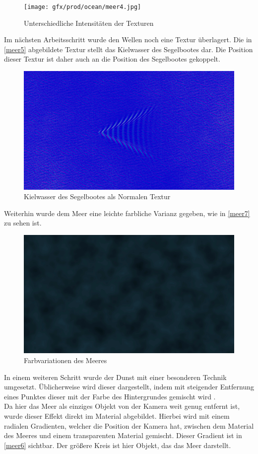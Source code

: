 \begin{figure}[H]
\texttt{[image: gfx/prod/ocean/meer4.jpg]}
\caption{Unterschiedliche Intensitäten der Texturen}
\label{meer4}
\end{figure}
\noindent
Im nächsten Arbeitsschritt wurde den Wellen noch eine Textur überlagert. Die in \autoref{meer5} abgebildete Textur  stellt das Kielwasser des Segelbootes dar. Die Position dieser Textur ist daher auch an die Position des Segelbootes gekoppelt.
%
\begin{figure}[H]
\includegraphics[width=\textwidth]{gfx/prod/ocean/meer5.jpg}
\caption{Kielwasser des Segelbootes als Normalen Textur}
\label{meer5}
\end{figure}
\noindent
Weiterhin wurde dem Meer eine leichte farbliche Varianz gegeben, wie in \autoref{meer7} zu sehen ist.

\begin{figure}[H]
\includegraphics[width=\textwidth]{gfx/prod/ocean/meer7.jpg}
\caption{Farbvariationen des Meeres}
\label{meer7}
\end{figure}
\noindent
In einem weiteren Schritt wurde der Dunst mit einer besonderen Technik umgesetzt. Üblicherweise wird dieser dargestellt, indem mit steigender Entfernung eines Punktes dieser mit der Farbe des Hintergrundes gemischt wird .\\
Da hier das Meer als einziges Objekt von der Kamera weit genug entfernt ist, wurde dieser Effekt direkt im Material abgebildet. Hierbei wird mit einem radialen Gradienten, welcher die Position der Kamera hat, zwischen dem Material des Meeres und einem transparenten Material gemischt. Dieser Gradient ist in \autoref{meer6} sichtbar. Der größere Kreis ist hier Objekt, das das Meer darstellt.

